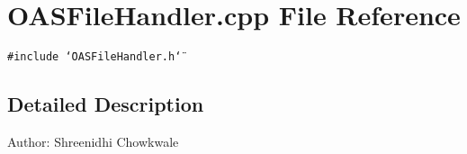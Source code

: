 \section{OASFile\-Handler.cpp File Reference}
\label{OASFileHandler_8cpp}
{\tt \#include \char`\"{}OASFile\-Handler.h\char`\"{}}\par


\subsection{Detailed Description}
\begin{Desc}
\item[Author:]Shreenidhi Chowkwale \end{Desc}
